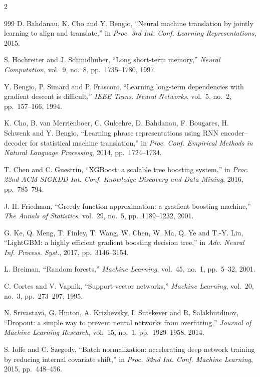 \begin{footnotesize}
\begin{multicols}{2}
\begin{thebibliography}{999}
 D. Bahdanau, K. Cho and Y. Bengio, ``Neural machine translation by jointly
learning to align and translate,'' in \emph{Proc. 3rd Int. Conf. Learning Representations}, 2015.

 S. Hochreiter and J. Schmidhuber, ``Long short-term memory,'' \emph{Neural
Computation}, vol.~9, no.~8, pp.~1735--1780, 1997.

 Y. Bengio, P. Simard and P. Frasconi, ``Learning long-term dependencies with
gradient descent is difficult,'' \emph{IEEE Trans. Neural Networks}, vol.~5, no.~2, pp.~157--166,
1994.

 K. Cho, B. van Merri\"enboer, C. Gulcehre, D. Bahdanau, F. Bougares,
H. Schwenk and Y. Bengio, ``Learning phrase representations using RNN encoder--decoder for
statistical machine translation,'' in \emph{Proc. Conf. Empirical Methods in Natural Language
Processing}, 2014, pp.~1724--1734.

 T. Chen and C. Guestrin, ``XGBoost: a scalable tree boosting system,'' in
\emph{Proc. 22nd ACM SIGKDD Int. Conf. Knowledge Discovery and Data Mining}, 2016, pp.~785--794.

 J. H. Friedman, ``Greedy function approximation: a gradient boosting
machine,'' \emph{The Annals of Statistics}, vol.~29, no.~5, pp.~1189--1232, 2001.

 G. Ke, Q. Meng, T. Finley, T. Wang, W. Chen, W. Ma, Q. Ye and T.-Y. Liu,
``LightGBM: a highly efficient gradient boosting decision tree,'' in \emph{Adv. Neural Inf.
Process. Syst.}, 2017, pp.~3146--3154.

 L. Breiman, ``Random forests,'' \emph{Machine Learning}, vol.~45, no.~1,
pp.~5--32, 2001.

 C. Cortes and V. Vapnik, ``Support-vector networks,'' \emph{Machine
Learning}, vol.~20, no.~3, pp.~273--297, 1995.

 N. Srivastava, G. Hinton, A. Krizhevsky, I. Sutskever and
R. Salakhutdinov, ``Dropout: a simple way to prevent neural networks from overfitting,''
\emph{Journal of Machine Learning Research}, vol.~15, no.~1, pp.~1929--1958, 2014.

 S. Ioffe and C. Szegedy, ``Batch normalization: accelerating deep network
training by reducing internal covariate shift,'' in \emph{Proc. 32nd Int. Conf. Machine Learning},
2015, pp.~448--456.


\end{thebibliography}
\end{multicols}
\end{footnotesize}

